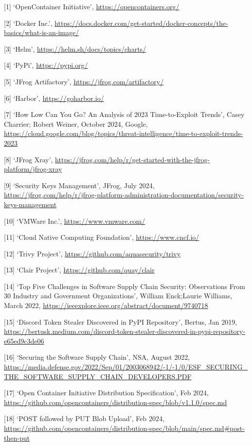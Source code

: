 \documentclass{article}
\begin{document}
  [1] `OpenContainer Initiative', \url{https://opencontainers.org/}
  
  [2] `Docker Inc.', \url{https://docs.docker.com/get-started/docker-concepts/the-basics/what-is-an-image/}

  [3] `Helm', \url{https://helm.sh/docs/topics/charts/}

  [4] `PyPi', \url{https://pypi.org/}

  [5] `JFrog Artifactory', \url{https://jfrog.com/artifactory/}

  [6] `Harbor', \url{https://goharbor.io/}

  [7] `How Low Can You Go? An Analysis of 2023 Time-to-Exploit Trends', Casey Charrier; Robert Weiner, October 2024, Google, \url{https://cloud.google.com/blog/topics/threat-intelligence/time-to-exploit-trends-2023}

  [8] `JFrog Xray', \url{https://jfrog.com/help/r/get-started-with-the-jfrog-platform/jfrog-xray}

  [9] `Security Keys Management', JFrog, July 2024, \url{https://jfrog.com/help/r/jfrog-platform-administration-documentation/security-keys-management}

  [10] `VMWare Inc.', \url{https://www.vmware.com/}

  [11] `Cloud Native Computing Foundation', \url{https://www.cncf.io/}

  [12] `Trivy Project', \url{https://github.com/aquasecurity/trivy}

  [13] `Clair Project', \url{https://github.com/quay/clair}
  
  [14] `Top Five Challenges in Software Supply Chain Security: Observations From 30 Industry and Government Organizations', William Enck;Laurie Williams, March 2022, \url{https://ieeexplore.ieee.org/abstract/document/9740718}

  [15] `Discord Token Stealer Discovered in PyPI Repository', Bertus, Jan 2019, \url{https://bertusk.medium.com/discord-token-stealer-discovered-in-pypi-repository-e65ed9c3de06}

  [16] `Securing the Software Supply Chain', NSA, August 2022, \url{https://media.defense.gov/2022/Sep/01/2003068942/-1/-1/0/ESF_SECURING_THE_SOFTWARE_SUPPLY_CHAIN_DEVELOPERS.PDF}

  [17] `Open Container Initiative Distribution Specification', Feb 2024, \url{https://github.com/opencontainers/distribution-spec/blob/v1.1.0/spec.md}

  [18] `POST followed by PUT Blob Upload', Feb 2024, \url{https://github.com/opencontainers/distribution-spec/blob/main/spec.md#post-then-put}
\end{document}
